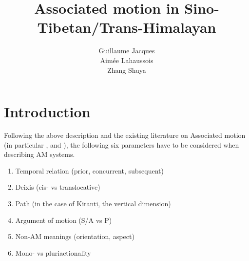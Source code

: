 \documentclass[oneside,a4paper,11pt]{article}
\begin{document}
 
\title{Associated motion in Sino-Tibetan/Trans-Himalayan}
\author{Guillaume Jacques\\ Aimée Lahaussois \\ Zhang Shuya}
\maketitle
%
%
%

\section{Introduction}

Following the above description and the existing literature on Associated motion (in particular \citealt{koch84associated.motion}, \citealt{wilkins91associated.motion} and \citealt{guillaume16am}), the following six parameters have to be considered when describing AM systems. 

\begin{enumerate}
\item Temporal relation (prior, concurrent, subsequent)
\item Deixis (cis- vs translocative)
\item Path (in the case of Kiranti, the vertical dimension)
\item Argument of motion (S/A vs P)
\item Non-AM meanings (orientation, aspect)
\item Mono- vs pluriactionality
\end{enumerate}
\end{document}
